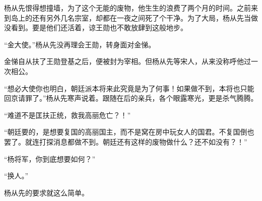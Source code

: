 杨从先恨得想撞墙，为了这个无能的废物，他生生的浪费了两个月的时间。之前来到岛上的还有另外几名宗室，却都在一夜之间死了个干净。为了大局，杨从先当做没看到。要是他们还活着，谅王勋也不敢放肆到这般地步。

“金大使。”杨从先没再理会王勋，转身面对金悌。

金悌自从扶了王勋登基之后，便被封为宰相。但杨从先等宋人，从来没称呼他过一次相公。

“想必大使你也明白，朝廷派本将来此究竟是为了何事！如果做不到，本将也只能回京请罪了。”杨从先寒声说着。跟随在后的亲兵，各个眼露寒光，更是杀气腾腾。

“难道不是匡扶正统，救我高丽危亡？！”

“朝廷要的，是想要复国的高丽国主，而不是窝在房中玩女人的国君。不复国倒也罢了。就连打探消息都做不到。朝廷还有这样的废物做什么？还不如没有？！”

“杨将军，你到底想要如何？”

“换人。”

杨从先的要求就这么简单。

